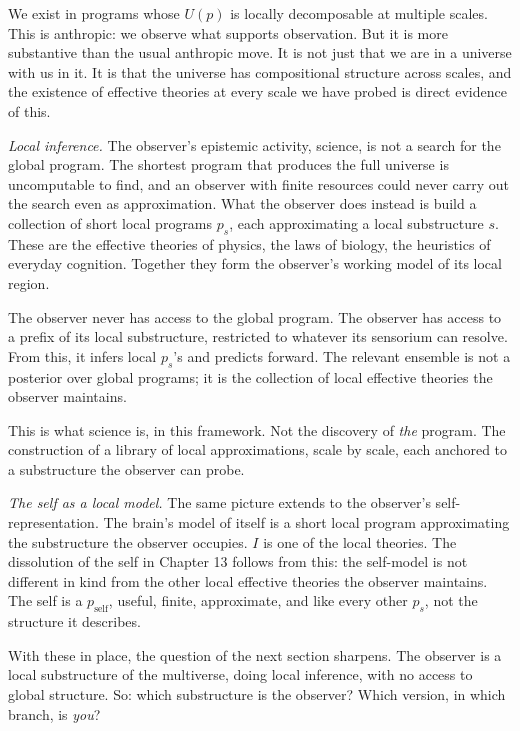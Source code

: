 We exist in programs whose $U(p)$ is locally decomposable at multiple scales. This is anthropic: we observe what supports observation. But it is more substantive than the usual anthropic move. It is not just that we are in a universe with us in it. It is that the universe has compositional structure across scales, and the existence of effective theories at every scale we have probed is direct evidence of this.

\emph{Local inference.} The observer's epistemic activity, science, is not a search for the global program. The shortest program that produces the full universe is uncomputable to find, and an observer with finite resources could never carry out the search even as approximation. What the observer does instead is build a collection of short local programs $p_s$, each approximating a local substructure $s$. These are the effective theories of physics, the laws of biology, the heuristics of everyday cognition. Together they form the observer's working model of its local region.

The observer never has access to the global program. The observer has access to a prefix of its local substructure, restricted to whatever its sensorium can resolve. From this, it infers local $p_s$'s and predicts forward. The relevant ensemble is not a posterior over global programs; it is the collection of local effective theories the observer maintains.

This is what science is, in this framework. Not the discovery of \emph{the} program. The construction of a library of local approximations, scale by scale, each anchored to a substructure the observer can probe.

\emph{The self as a local model.} The same picture extends to the observer's self-representation. The brain's model of itself is a short local program approximating the substructure the observer occupies. $I$ is one of the local theories. The dissolution of the self in Chapter 13 follows from this: the self-model is not different in kind from the other local effective theories the observer maintains. The self is a $p_{\text{self}}$, useful, finite, approximate, and like every other $p_s$, not the structure it describes.

With these in place, the question of the next section sharpens. The observer is a local substructure of the multiverse, doing local inference, with no access to global structure. So: which substructure is the observer? Which version, in which branch, is \emph{you}?

